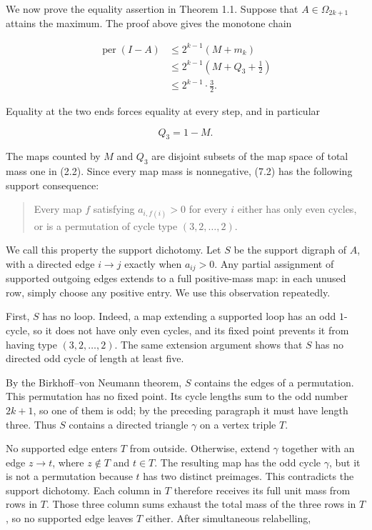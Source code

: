 \documentclass[11pt]{article}
\theoremstyle{remark}
\begin{document}
We now prove the equality assertion in Theorem 1.1. Suppose that
$A\in\Omega_{2k+1}$ attains the maximum. The proof above gives the monotone
chain

\[
\begin{aligned}
\operatorname{per}(I-A)
&\le 2^{k-1}(M+m_k)\\
&\le 2^{k-1}\left(M+Q_3+\frac12\right)\\
&\le 2^{k-1}\cdot\frac32.
\end{aligned}
\tag{7.1}
\]

Equality at the two ends forces equality at every step, and in particular

\[
Q_3=1-M.
\tag{7.2}
\]

The maps counted by $M$ and $Q_3$ are disjoint subsets of the map space of
total mass one in (2.2). Since every map mass is nonnegative, (7.2) has the
following support consequence:

\begin{quote}
Every map $f$ satisfying $a_{i,f(i)}>0$ for every $i$ either has only even
cycles, or is a permutation of cycle type $(3,2,\ldots,2)$.
\end{quote}

We call this property the support dichotomy. Let $S$ be the support digraph
of $A$, with a directed edge $i\to j$ exactly when $a_{ij}>0$. Any partial
assignment of supported outgoing edges extends to a full positive-mass map:
in each unused row, simply choose any positive entry. We use this observation
repeatedly.

First, $S$ has no loop. Indeed, a map extending a supported loop has an odd
$1$-cycle, so it does not have only even cycles, and its fixed point prevents
it from having type $(3,2,\ldots,2)$. The same extension argument shows that
$S$ has no directed odd cycle of length at least five.

By the Birkhoff--von Neumann theorem, $S$ contains the edges of a
permutation. This permutation has no fixed point. Its cycle lengths sum to
the odd number $2k+1$, so one of them is odd; by the preceding paragraph it
must have length three. Thus $S$ contains a directed triangle $\gamma$ on
a vertex triple $T$.

No supported edge enters $T$ from outside. Otherwise, extend $\gamma$
together with an edge $z\to t$, where $z\notin T$ and $t\in T$. The
resulting map has the odd cycle $\gamma$, but it is not a permutation because
$t$ has two distinct preimages. This contradicts the support dichotomy. Each
column in $T$ therefore receives its full unit mass from rows in $T$. Those
three column sums exhaust the total mass of the three rows in $T$, so no
supported edge leaves $T$ either. After simultaneous relabelling,
\end{document}
